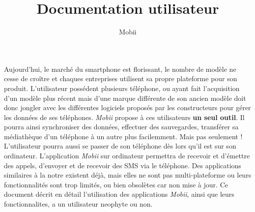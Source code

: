 \documentclass{koala-fr}
\begin{document}
\title{Documentation utilisateur}
\subtitle{Mobii}


\summary
{
  Aujourd'hui, le marché du smartphone est florissant, le nombre de modèle ne cesse de croître et chaques
  entreprises utilisent sa propre plateforme pour son produit.
  \newline
  \newline
  L'utilisateur possédent plusieurs téléphone, ou ayant fait l'acquisition d'un modèle plus récent
  mais d'une marque différente de son ancien modèle doit donc jongler avec les différentes logiciels proposés
  par les constructeurs pour gérer les données de ses téléphones.
  \newline
  \newline
  \emph{Mobii} propose à ces utilisateurs \textbf{un seul outil}.
  Il pourra ainsi synchroniser des données, effectuer des sauvegardes,
  transférer sa médiathèque d'un téléphone à un autre plus facilemment.
  \newline
  \newline
  Mais pas seulement ! L'utilisateur pourra aussi se passer de son téléphone dès lors qu'il est sur son
  ordinateur. L'application \emph{Mobii} sur ordinateur permettra de recevoir et d'émettre des appels,
  d'envoyer et de recevoir des SMS via le téléphone.
  \newline
  \newline
  Des applications similaires à la notre existent déjà, mais elles ne sont pas multi-plateforme ou leurs
  fonctionnalités sont trop limités, ou bien obsolètes car non mise à jour.
  \newline
  \newline
  \newline
  \newline
  Ce document décrit en détail l'utilisation des applications \emph{Mobii}, ainsi que leurs fonctionnalites, a un utilisateur neophyte ou non.
}

\maketitle
\end{document}
